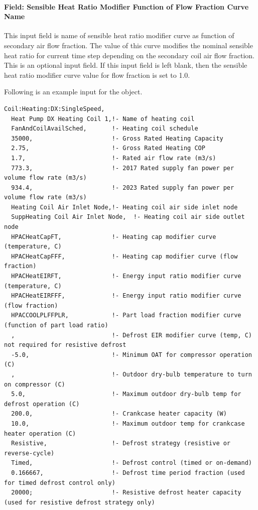 \paragraph{Field: Sensible Heat Ratio Modifier Function of Flow Fraction Curve Name}\label{field-sensible-heat-ratio-modifier-function-of-flow-fraction-curve-name}

This input field is name of sensible heat ratio modifier curve as function of secondary air flow fraction. The value of this curve modifies the nominal sensible heat ratio for current time step depending on the secondary coil air flow fraction. This is an optional input field. If this input field is left blank, then the sensible heat ratio modifier curve value for flow fraction is set to 1.0.

Following is an example input for the object.

\begin{lstlisting}
Coil:Heating:DX:SingleSpeed,
  Heat Pump DX Heating Coil 1,!- Name of heating coil
  FanAndCoilAvailSched,       !- Heating coil schedule
  35000,                      !- Gross Rated Heating Capacity
  2.75,                       !- Gross Rated Heating COP
  1.7,                        !- Rated air flow rate (m3/s)
  773.3,                      !- 2017 Rated supply fan power per volume flow rate (m3/s)
  934.4,                      !- 2023 Rated supply fan power per volume flow rate (m3/s)
  Heating Coil Air Inlet Node,!- Heating coil air side inlet node
  SuppHeating Coil Air Inlet Node,  !- Heating coil air side outlet node
  HPACHeatCapFT,              !- Heating cap modifier curve (temperature, C)
  HPACHeatCapFFF,             !- Heating cap modifier curve (flow fraction)
  HPACHeatEIRFT,              !- Energy input ratio modifier curve (temperature, C)
  HPACHeatEIRFFF,             !- Energy input ratio modifier curve (flow fraction)
  HPACCOOLPLFFPLR,            !- Part load fraction modifier curve (function of part load ratio)
  ,                           !- Defrost EIR modifier curve (temp, C) not required for resistive defrost
  -5.0,                       !- Minimum OAT for compressor operation (C)
  ,                           !- Outdoor dry-bulb temperature to turn on compressor (C)
  5.0,                        !- Maximum outdoor dry-bulb temp for defrost operation (C)
  200.0,                      !- Crankcase heater capacity (W)
  10.0,                       !- Maximum outdoor temp for crankcase heater operation (C)
  Resistive,                  !- Defrost strategy (resistive or reverse-cycle)
  Timed,                      !- Defrost control (timed or on-demand)
  0.166667,                   !- Defrost time period fraction (used for timed defrost control only)
  20000;                      !- Resistive defrost heater capacity (used for resistive defrost strategy only)
\end{lstlisting}


